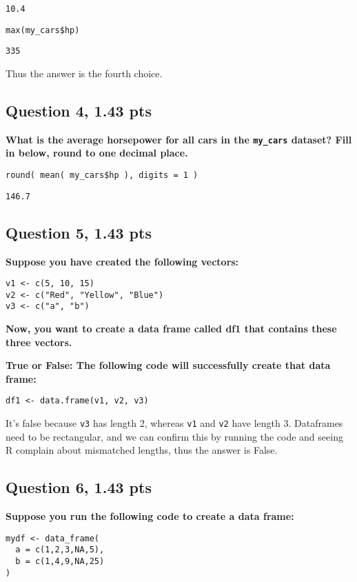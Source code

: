 \documentclass[11pt]{article}
\begin{document}
\begin{verbatim}
10.4
\end{verbatim}


\begin{verbatim}
max(my_cars$hp)
\end{verbatim}

\begin{verbatim}
335
\end{verbatim}


Thus the answer is the fourth choice.

\subsection*{Question 4, 1.43 pts}
\label{sec:org5b0269c}
\textbf{What is the average horsepower for all cars in the \texttt{my\_cars} dataset? Fill in below, round to one decimal place.}
\begin{verbatim}
round( mean( my_cars$hp ), digits = 1 )
\end{verbatim}

\begin{verbatim}
146.7
\end{verbatim}

\subsection*{Question 5, 1.43 pts}
\label{sec:org43fa858}
\textbf{Suppose you have created the following vectors:}
\begin{verbatim}
v1 <- c(5, 10, 15)
v2 <- c("Red", "Yellow", "Blue")
v3 <- c("a", "b")
\end{verbatim}

\textbf{Now, you want to create a data frame called df1 that contains these three vectors.}

\textbf{True or False: The following code will successfully create that data frame:}

\begin{verbatim}
df1 <- data.frame(v1, v2, v3)
\end{verbatim}

It's false because \texttt{v3} has length 2, whereas \texttt{v1} and \texttt{v2} have length 3.  Dataframes need to be rectangular, and we can confirm this by running the code and seeing R complain about mismatched lengths, thus the answer is False.

\subsection*{Question 6, 1.43 pts}
\label{sec:org630ac1a}
\textbf{Suppose you run the following code to create a data frame:}
\begin{verbatim}
mydf <- data_frame(
  a = c(1,2,3,NA,5),
  b = c(1,4,9,NA,25)
)
\end{verbatim}
\end{document}
